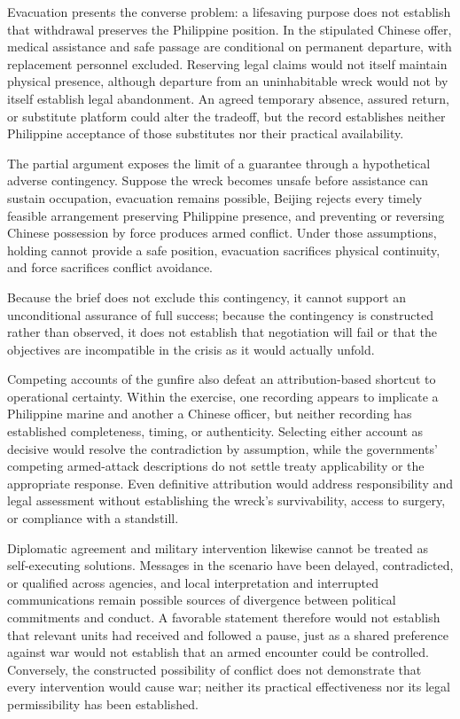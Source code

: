 \documentclass[11pt]{article}
\begin{document}
Evacuation presents the converse problem: a lifesaving purpose does not establish that withdrawal preserves the Philippine position. In the stipulated Chinese offer, medical assistance and safe passage are conditional on permanent departure, with replacement personnel excluded. Reserving legal claims would not itself maintain physical presence, although departure from an uninhabitable wreck would not by itself establish legal abandonment. An agreed temporary absence, assured return, or substitute platform could alter the tradeoff, but the record establishes neither Philippine acceptance of those substitutes nor their practical availability.

The partial argument exposes the limit of a guarantee through a hypothetical adverse contingency. Suppose the wreck becomes unsafe before assistance can sustain occupation, evacuation remains possible, Beijing rejects every timely feasible arrangement preserving Philippine presence, and preventing or reversing Chinese possession by force produces armed conflict. Under those assumptions, holding cannot provide a safe position, evacuation sacrifices physical continuity, and force sacrifices conflict avoidance.

Because the brief does not exclude this contingency, it cannot support an unconditional assurance of full success; because the contingency is constructed rather than observed, it does not establish that negotiation will fail or that the objectives are incompatible in the crisis as it would actually unfold.

Competing accounts of the gunfire also defeat an attribution-based shortcut to operational certainty. Within the exercise, one recording appears to implicate a Philippine marine and another a Chinese officer, but neither recording has established completeness, timing, or authenticity. Selecting either account as decisive would resolve the contradiction by assumption, while the governments’ competing armed-attack descriptions do not settle treaty applicability or the appropriate response. Even definitive attribution would address responsibility and legal assessment without establishing the wreck’s survivability, access to surgery, or compliance with a standstill.

Diplomatic agreement and military intervention likewise cannot be treated as self-executing solutions. Messages in the scenario have been delayed, contradicted, or qualified across agencies, and local interpretation and interrupted communications remain possible sources of divergence between political commitments and conduct. A favorable statement therefore would not establish that relevant units had received and followed a pause, just as a shared preference against war would not establish that an armed encounter could be controlled. Conversely, the constructed possibility of conflict does not demonstrate that every intervention would cause war; neither its practical effectiveness nor its legal permissibility has been established.
\end{document}
